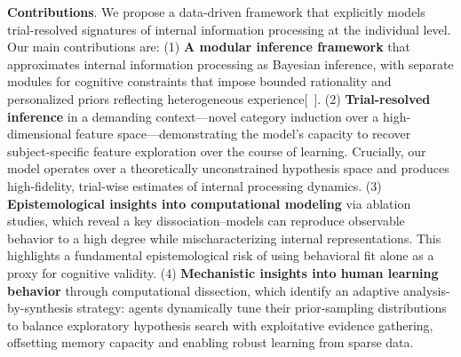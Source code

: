  \textbf{Contributions}. We propose a data-driven framework that explicitly models trial-resolved signatures of internal information processing at the individual level. Our main contributions are:
(1) \textbf{A modular inference framework} that approximates internal information processing as Bayesian inference, with separate modules for cognitive constraints that impose bounded rationality and personalized priors reflecting heterogeneous experience[~\cite{cohen2013high,jaworska2022different}].
(2) \textbf{Trial-resolved inference} in a demanding context––novel category induction over a high-dimensional feature space––demonstrating the model’s capacity to recover subject-specific feature exploration over the course of learning. Crucially, our model operates over a theoretically unconstrained hypothesis space and produces high-fidelity, trial-wise estimates of internal processing dynamics.
(3) \textbf{Epistemological insights into computational modeling} via ablation studies, which reveal a key dissociation--models can reproduce observable behavior to a high degree while mischaracterizing internal representations. This highlights a fundamental epistemological risk of using behavioral fit alone as a proxy for cognitive validity.
(4) \textbf{Mechanistic insights into human learning behavior} through computational dissection, which identify an adaptive analysis-by-synthesis strategy: agents dynamically tune their prior-sampling distributions to balance exploratory hypothesis search with exploitative evidence gathering, offsetting memory capacity and enabling robust learning from sparse data.


